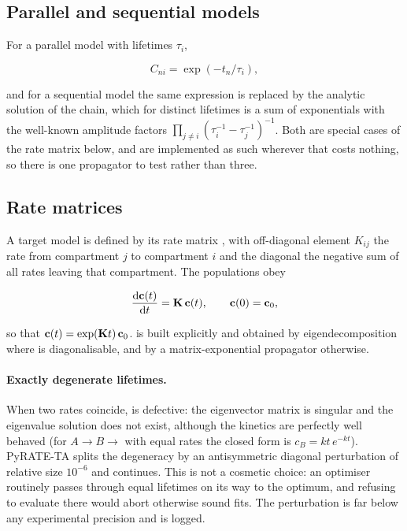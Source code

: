 \subsection{Parallel and sequential models}

For a parallel model with lifetimes $\tau_i$,

\begin{equation}
  C_{ni} = \exp\!\left(-t_n/\tau_i\right),
\end{equation}

and for a sequential model the same expression is replaced by the analytic
solution of the chain, which for distinct lifetimes is a sum of exponentials
with the well-known amplitude factors
$\prod_{j\neq i}\left(\tau_i^{-1}-\tau_j^{-1}\right)^{-1}$. Both are special
cases of the rate matrix below, and are implemented as such wherever that costs
nothing, so there is one propagator to test rather than three.

\subsection{Rate matrices}\label{sec:kmat}

A target model is defined by its rate matrix \Kmat, with off-diagonal element
$K_{ij}$ the rate from compartment $j$ to compartment $i$ and the diagonal the
negative sum of all rates leaving that compartment. The populations obey

\begin{equation}
  \frac{\mathrm{d}\mathbf{c}(t)}{\mathrm{d}t} = \mathbf{K}\,\mathbf{c}(t),
  \qquad
  \mathbf{c}(0) = \mathbf{c}_0 ,
\end{equation}

so that $\mathbf{c}(t) = \exp(\mathbf{K} t)\,\mathbf{c}_0$. \Kmat{} is built
explicitly and \Cmat{} obtained by eigendecomposition where \Kmat{} is
diagonalisable, and by a matrix-exponential propagator otherwise.

\paragraph{Exactly degenerate lifetimes.} When two rates coincide, \Kmat{} is
defective: the eigenvector matrix is singular and the eigenvalue solution does
not exist, although the kinetics are perfectly well behaved (for
$A \rightarrow B \rightarrow$ with equal rates the closed form is
$c_B = kt\,e^{-kt}$). PyRATE-TA splits the degeneracy by an antisymmetric diagonal
perturbation of relative size $10^{-6}$ and continues. This is not a cosmetic
choice: an optimiser routinely passes through equal lifetimes on its way to the
optimum, and refusing to evaluate there would abort otherwise sound fits. The
perturbation is far below any experimental precision and is logged.

